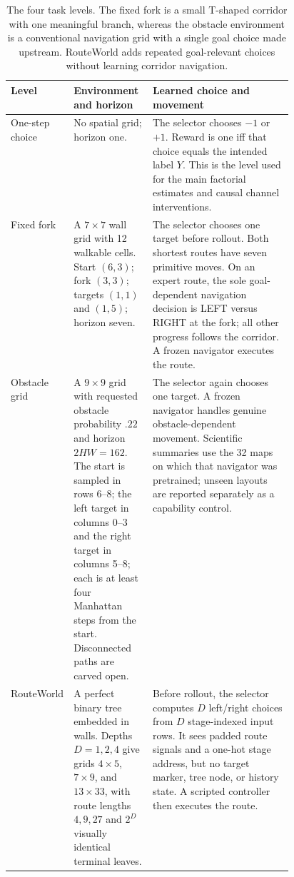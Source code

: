 \begin{table}[!htbp]
\centering
\small
\begin{tabularx}{\linewidth}{@{}p{0.17\linewidth}p{0.29\linewidth}X@{}}
\toprule
Level & Environment and horizon & Learned choice and movement \\
\midrule
One-step choice & No spatial grid; horizon one. & The selector chooses $-1$ or $+1$. Reward is one iff that choice equals the intended label $Y$. This is the level used for the main factorial estimates and causal channel interventions. \\
Fixed fork & A $7\times7$ wall grid with 12 walkable cells. Start $(6,3)$; fork $(3,3)$; targets $(1,1)$ and $(1,5)$; horizon seven. & The selector chooses one target before rollout. Both shortest routes have seven primitive moves. On an expert route, the sole goal-dependent navigation decision is LEFT versus RIGHT at the fork; all other progress follows the corridor. A frozen navigator executes the route. \\
Obstacle grid & A $9\times9$ grid with requested obstacle probability $.22$ and horizon $2HW=162$. The start is sampled in rows 6--8; the left target in columns 0--3 and the right target in columns 5--8; each is at least four Manhattan steps from the start. Disconnected paths are carved open. & The selector again chooses one target. A frozen navigator handles genuine obstacle-dependent movement. Scientific summaries use the 32 maps on which that navigator was pretrained; unseen layouts are reported separately as a capability control. \\
RouteWorld & A perfect binary tree embedded in walls. Depths $D=1,2,4$ give grids $4\times5$, $7\times9$, and $13\times33$, with route lengths $4,9,27$ and $2^D$ visually identical terminal leaves. & Before rollout, the selector computes $D$ left/right choices from $D$ stage-indexed input rows. It sees padded route signals and a one-hot stage address, but no target marker, tree node, or history state. A scripted controller then executes the route. \\
\bottomrule
\end{tabularx}
\caption{The four task levels. The fixed fork is a small T-shaped corridor with one meaningful branch, whereas the obstacle environment is a conventional navigation grid with a single goal choice made upstream. RouteWorld adds repeated goal-relevant choices without learning corridor navigation.}
\label{tab:environment-levels}
\end{table}

